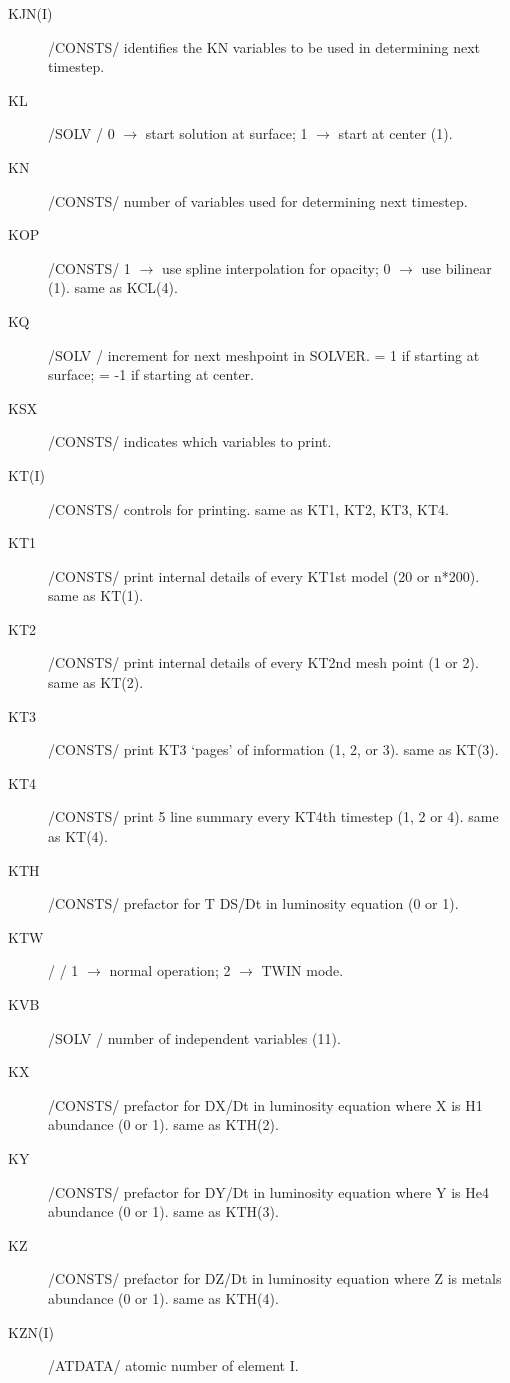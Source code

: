 \documentclass{article}
\begin{document}
\begin{description}
	\item[KJN(I)]		/CONSTS/ identifies the KN variables to be used in determining next timestep.

	\item[KL]		    /SOLV  / 0 $\to$ start solution at surface; 1 $\to$ start at center  (1).

	\item[KN]		    /CONSTS/ number of variables used for determining next timestep.

	\item[KOP]		    /CONSTS/ 1 $\to$ use spline interpolation for opacity; 0 $\to$ use bilinear (1). same as KCL(4).

	\item[KQ]		    /SOLV  / increment for next meshpoint in SOLVER.
	                     = 1 if starting at surface; = -1 if starting at center.
	
	\item[KSX]		    /CONSTS/ indicates which variables to print.

	\item[KT(I)]       /CONSTS/ controls for printing. same as KT1, KT2, KT3, KT4.
	
	\item[KT1]		    /CONSTS/ print internal details of every KT1st model (20 or n*200). same as KT(1).

	\item[KT2]		    /CONSTS/ print internal details of every KT2nd mesh point (1 or 2). same as KT(2).

	\item[KT3]		    /CONSTS/ print KT3 `pages' of information (1, 2, or 3). same as KT(3).

	\item[KT4]		    /CONSTS/ print 5 line summary every KT4th timestep (1, 2 or 4). same as KT(4).

	\item[KTH]		    /CONSTS/ prefactor for T DS/Dt in luminosity equation (0 or 1).

	\item[KTW]		    /      / 1 $\to$ normal operation; 2 $\to$ TWIN mode.

	\item[KVB]		    /SOLV  / number of independent variables (11).

	\item[KX]		    /CONSTS/ prefactor for DX/Dt in luminosity equation where X is H1 abundance (0 or 1). same as KTH(2).
	
	\item[KY]		    /CONSTS/ prefactor for DY/Dt in luminosity equation where Y is He4 abundance (0 or 1). same as KTH(3).
	
	\item[KZ]		    /CONSTS/ prefactor for DZ/Dt in luminosity equation where Z is metals abundance (0 or 1). same as KTH(4).
	
	\item[KZN(I)]     	/ATDATA/  atomic number of element I.

\end{description}
\end{document}

